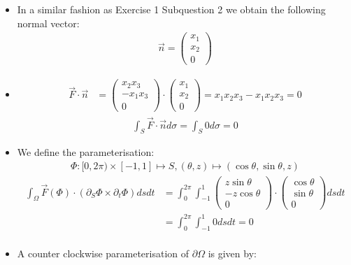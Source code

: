\documentclass[11pt]{article}
\begin{document}
\begin{solution}     
    \begin{itemize}
    \item
    In a similar fashion as Exercise 1 Subquestion 2 we obtain the following normal vector:
		\begin{gather*}\vec{n} = \begin{pmatrix} x_1\\x_2\\0 \end{pmatrix}\end{gather*}
    \item 
	\begin{align*}
	\vec F \cdot \vec n & = \begin{pmatrix}x_2x_3 \\ -x_1x_3\\0\end{pmatrix}\cdot \begin{pmatrix}x_1 \\ x_2\\0\end{pmatrix} = x_1x_2x_3 - x_1x_2x_3 = 0
	\end{align*}
	\begin{align*}
        \int_S \vec F \cdot \vec{n}d\sigma = \int_S 0 d\sigma = 0
     \end{align*}
    \item
    We define the parameterisation: 
	\begin{gather*}
	\Phi: [0,2\pi) \times [-1,1] \mapsto S, (\theta ,z) \mapsto (\cos\theta, \sin\theta ,z)
	\end{gather*}
	\begin{align*}
        \int_\Omega \vec F(\Phi) \cdot ( \partial_S \Phi \times \partial_t \Phi ) dsdt &=\int_0^{2\pi} \int_{-1}^1 \begin{pmatrix}z\sin\theta\\ -z\cos\theta \\ 0\end{pmatrix} \cdot \begin{pmatrix}\cos\theta\\ \sin\theta \\ 0\end{pmatrix} dsdt \\
	    & = \int_0^{2\pi} \int_{-1}^1 0  dsdt  = 0\\
     \end{align*}
    \item 
    A counter clockwise parameterisation of $\partial \Omega$ is given by:

\end{itemize}
\end{solution}
\end{document}
